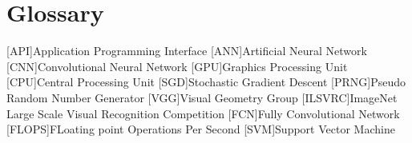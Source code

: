 \chapter{Glossary}

\footnotesize
\SingleSpacing

\begin{multicols}{2}
\begin{acronym}[AAAAAA]

	[API]{Application Programming Interface}
	[ANN]{Artificial Neural Network}
	[CNN]{Convolutional Neural Network}
	[GPU]{Graphics Processing Unit}
	[CPU]{Central Processing Unit}
	[SGD]{Stochastic Gradient Descent}
	[PRNG]{Pseudo Random Number Generator}
	[VGG]{Visual Geometry Group}
    [ILSVRC]{ImageNet Large Scale Visual Recognition Competition}
    [FCN]{Fully Convolutional Network}
    [FLOPS]{FLoating point Operations Per Second}
    [SVM]{Support Vector Machine}

\end{acronym}
\end{multicols}

